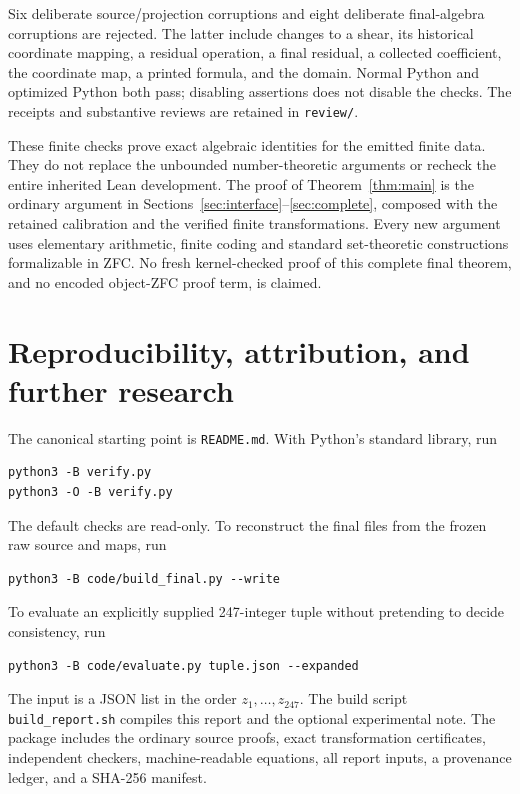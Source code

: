 \documentclass[11pt,letterpaper]{article}
\newcommand{\file}[1]{\texttt{\nolinkurl{#1}}}
\begin{document}
Six deliberate source/projection corruptions and eight deliberate
final-algebra corruptions are rejected. The latter include changes
to a shear, its historical coordinate mapping, a residual operation,
a final residual, a collected coefficient, the coordinate map,
a printed formula, and the domain. Normal Python and optimized
Python both pass; disabling assertions does not disable the checks.
The receipts and substantive reviews are retained in \file{review/}.

These finite checks prove exact algebraic identities for the emitted
finite data. They do not replace the unbounded number-theoretic
arguments or recheck the entire inherited Lean development.
The proof of Theorem~\ref{thm:main} is the ordinary argument in
Sections~\ref{sec:interface}--\ref{sec:complete}, composed with the
retained calibration and the verified finite transformations.
Every new argument uses elementary arithmetic, finite coding and
standard set-theoretic constructions formalizable in ZFC. No fresh
kernel-checked proof of this complete final theorem, and no encoded
object-ZFC proof term, is claimed.

\section{Reproducibility, attribution, and further research}
\label{sec:research}

The canonical starting point is \file{README.md}. With Python's
standard library, run
\begin{verbatim}
python3 -B verify.py
python3 -O -B verify.py
\end{verbatim}
The default checks are read-only. To reconstruct the final files from
the frozen raw source and maps, run
\begin{verbatim}
python3 -B code/build_final.py --write
\end{verbatim}
To evaluate an explicitly supplied 247-integer tuple without pretending
to decide consistency, run
\begin{verbatim}
python3 -B code/evaluate.py tuple.json --expanded
\end{verbatim}
The input is a JSON list in the order $z_1,\ldots,z_{247}$.
The build script \file{build_report.sh} compiles this report and the
optional experimental note. The package includes the ordinary source
proofs, exact transformation certificates, independent checkers,
machine-readable equations, all report inputs, a provenance ledger,
and a SHA-256 manifest.
\end{document}
